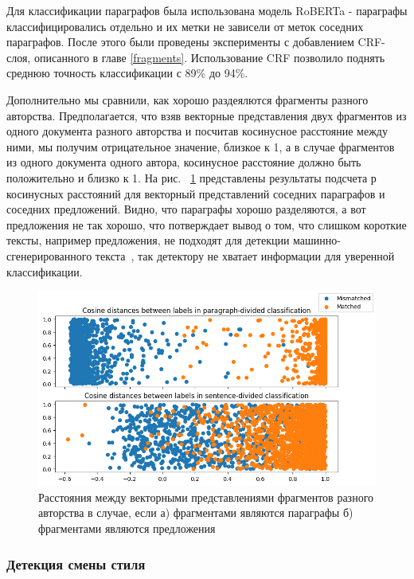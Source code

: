 Для классификации параграфов была использована модель RoBERTa - параграфы классифицировались отдельно и их метки не зависели от меток соседних параграфов. После этого были проведены эксперименты с добавлением CRF-слоя, описанного в главе \ref{fragments}. Использование CRF позволило поднять среднюю точность классификации с 89\% до 94\%.

Дополнительно мы сравнили, как хорошо раздеялются фрагменты разного авторства. Предполагается, что взяв векторные представления двух фрагментов из одного документа разного авторства и посчитав косинусное расстояние между ними, мы получим отрицательное значение, близкое к 1, а в случае фрагментов из одного документа одного автора, косинусное расстояние должно быть положительно и близко к 1. На рис. ~\ref{sent_vs_parapgrahs} представлены результаты подсчета р
косинусных расстояний для векторный представлений соседних параграфов и соседних предложений. Видно, что параграфы хорошо разделяются, а вот предложения не так хорошо, что потверждает вывод о том, что слишком короткие тексты, например предложения, не подходят для детекции машинно-сгенерированного текста~\cite{needmoretokens, mireshghallah-etal-2024-smaller}, так детектору не хватает информации для уверенной классификации.
\begin{figure}[!htb] %
\centering
\includegraphics[width=\linewidth]{images/sent_vs_paragraphs.png}
\caption{Расстояния между векторными представлениями фрагментов разного авторства в случае, если а) фрагментами являются параграфы б) фрагментами являются предложения}
\label{sent_vs_parapgrahs}
\end{figure}




\subsubsection{Детекция смены стиля}

